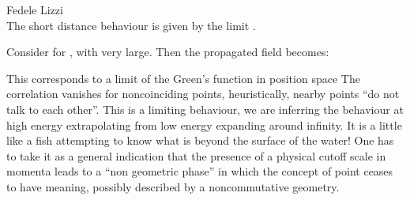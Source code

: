 \begin{artengenv}{Fedele Lizzi}
\noindent{}
\vspace*{-1.75\baselineskip}
\begin{equation}
\end{equation}
The short distance behaviour is given by the limit .

Consider  for , with  very large. 
Then the propagated field becomes:

\noindent{}
\vspace*{-.7\baselineskip}
\begin{equation}
\end{equation}
This  corresponds to a limit of the Green's function in position space
The correlation vanishes for noncoinciding points, heuristically, nearby points ``do not talk to each other''.
This is a limiting behaviour, we are inferring the behaviour at high energy extrapolating from low energy expanding around infinity. It is a little like a fish attempting to know what is beyond the surface of the water!
One has to take it as a general indication that the presence of a physical cutoff scale in momenta leads to a ``non geometric phase'' in which the concept of point ceases to have meaning, possibly described by a noncommutative geometry.


\end{artengenv}
